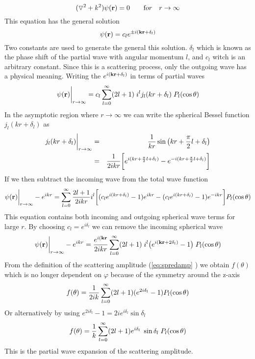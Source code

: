 %
\begin{equation}
({\bf \triangledown}^2+k^2 )\psi ({\bf r})=0\qquad {\text for}\quad r\to \infty 
\end{equation}
%
This equation has the general solution
%
\begin{equation}
\psi ({\bf r})=c_l e^{\pm i({\bf kr}+\delta_l)}
\end{equation}
%
Two constants are used to generate the general this solution. $\delta_l$ which is known as the phase shift of
the partial wave with angular momentum $l$, and $c_l$ witch is an arbitrary constant. Since this is a scattering 
process, only the outgoing wave has a physical meaning.
Writing the $e^{ i({\bf kr}+\delta_l)}$ in terms of partial waves
%
\begin{equation}
\psi ({\bf r})\bigg|_{r\to \infty}=c_l\sum^\infty_{l=0}(2l+1)\;i^l j_l({ kr}+\delta_l)\; P_l(\cos\theta)
\end{equation}
%
In the asymptotic region where $r\to \infty$ we can write the spherical Bessel function $j_l(kr+\delta_l)$ as
%
\begin{eqnarray}
j_l(kr+\delta_l)\bigg|_{r\to \infty}
&=&
\frac{1}{kr}\sin\big(kr+\frac{\pi}{2}l+\delta_l\big)\nonumber\\
&=& 
\frac{1}{2ikr}\bigg[e^{i(kr+\frac{\pi}{2}l+\delta_l)}-e^{-i(kr+\frac{\pi}{2}l+\delta_l)}\bigg]
\end{eqnarray}
%
If we then subtract the incoming wave from the total wave function
%
\begin{equation}
\psi ({\bf r})\bigg|_{r\to \infty}-e^{i{ kr}}=\sum^\infty_{l=0}\frac{2l+1}{2ikr}i^l 
\bigg[(c_l e^{ i({ kr}+\delta_l)}-1) e^{ i{ kr}}-(c_l e^{ i({ kr}+\delta_l)}-1) e^{-i{ kr}}\bigg]P_{l}(\cos\theta ) 
\end{equation}
%
This equation contains both incoming and outgoing spherical wave terms for large $r$.
By choosing $c_l=e^{ i\delta_l}$ we can remove the incoming spherical wave
%
\begin{equation}
\psi ({\bf r})\bigg|_{r\to \infty}-e^{i{ kr}}=\frac{e^{ i({\bf kr}}}{2ikr}\sum^\infty_{l=0}(2l+1)\;i^l
\big(e^{ i({\bf kr}+2\delta_l)}-1\big)\;P_{l}(\cos\theta )  
\end{equation}
%
From the definition of the scattering amplitude (\ref{eq:spredamp} ) we obtain $f(\theta)$
which is no longer dependent on $\varphi$ because of the symmetry around the z-axis
%
\begin{equation}\label{eq:fpart}
f(\theta)=\inv{2ik}\sum^{\infty}_{l=0} (2l+1)(e^{2i\delta_l}-1) P_{l}(\cos\theta)
\end{equation} 
%
Or alternatively by using $e^{2i\delta_l}-1=2ie^{i\delta_l}\sin\delta_l$
%
\begin{equation}
f(\theta)=\frac{1}{k}\sum^{\infty}_{l=0} (2l+1)e^{i\delta_l}\;\sin\delta_l\; P_{l}(\cos\theta)
\end{equation}
%
This is the partial wave expansion of the scattering amplitude.


